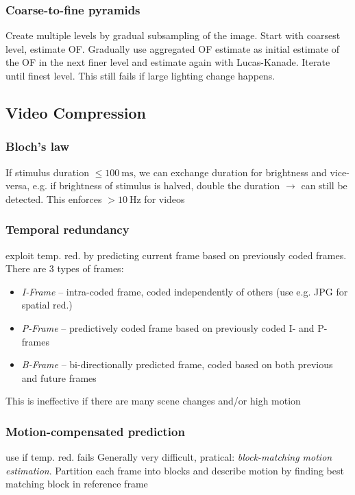 \documentclass[a4paper,10pt]{article}
\begin{document}
\subsubsection{Coarse-to-fine pyramids} Create multiple levels by gradual subsampling of the image. Start with coarsest level, estimate OF. Gradually use aggregated OF estimate as initial estimate of the OF in the next finer level and estimate again with Lucas-Kanade. Iterate until finest level. This still fails if large lighting change happens.

\subsection{Video Compression}
\subsubsection{Bloch's law} If stimulus duration \( \le \qty{100}{\milli\second}\), we can exchange duration for brightness and vice-versa, e.g. if brightness of stimulus is halved, double the duration \( \rightarrow \) can still be detected. This enforces \( > \qty{10}{\hertz} \) for videos
\subsubsection{Temporal redundancy} exploit temp. red. by predicting current frame based on previously coded frames. There are 3 types of frames:
    \begin{itemize}
	\item \textit{I-Frame} -- intra-coded frame, coded independently of others (use e.g. JPG for spatial red.)
	\item \textit{P-Frame} -- predictively coded frame based on previously coded I- and P-frames
	\item \textit{B-Frame} -- bi-directionally predicted frame, coded based on both previous and future frames
    \end{itemize}
This is ineffective if there are many scene changes and/or high motion

\subsubsection{Motion-compensated prediction} use if temp. red. fails Generally very difficult, pratical: \textit{block-matching motion estimation}. Partition each frame into blocks and describe motion by finding best matching block in reference frame
\end{document}
